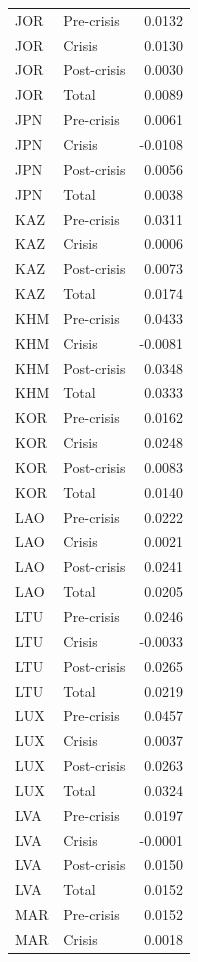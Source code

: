 \begin{longtable}[t]{llr}
JOR & Pre-crisis & 0.0132\\
JOR & Crisis & 0.0130\\
\addlinespace
JOR & Post-crisis & 0.0030\\
JOR & Total & 0.0089\\
JPN & Pre-crisis & 0.0061\\
JPN & Crisis & -0.0108\\
JPN & Post-crisis & 0.0056\\
\addlinespace
JPN & Total & 0.0038\\
KAZ & Pre-crisis & 0.0311\\
KAZ & Crisis & 0.0006\\
KAZ & Post-crisis & 0.0073\\
KAZ & Total & 0.0174\\
\addlinespace
KHM & Pre-crisis & 0.0433\\
KHM & Crisis & -0.0081\\
KHM & Post-crisis & 0.0348\\
KHM & Total & 0.0333\\
KOR & Pre-crisis & 0.0162\\
\addlinespace
KOR & Crisis & 0.0248\\
KOR & Post-crisis & 0.0083\\
KOR & Total & 0.0140\\
LAO & Pre-crisis & 0.0222\\
LAO & Crisis & 0.0021\\
\addlinespace
LAO & Post-crisis & 0.0241\\
LAO & Total & 0.0205\\
LTU & Pre-crisis & 0.0246\\
LTU & Crisis & -0.0033\\
LTU & Post-crisis & 0.0265\\
\addlinespace
LTU & Total & 0.0219\\
LUX & Pre-crisis & 0.0457\\
LUX & Crisis & 0.0037\\
LUX & Post-crisis & 0.0263\\
LUX & Total & 0.0324\\
\addlinespace
LVA & Pre-crisis & 0.0197\\
LVA & Crisis & -0.0001\\
LVA & Post-crisis & 0.0150\\
LVA & Total & 0.0152\\
MAR & Pre-crisis & 0.0152\\
\addlinespace
MAR & Crisis & 0.0018\\

\end{longtable}
